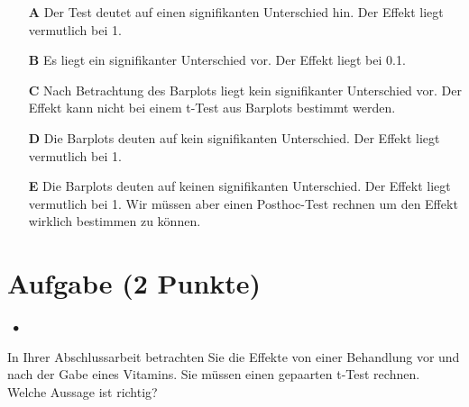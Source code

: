 \documentclass[a4paper, 9pt]{scrartcl}\usepackage[]{graphicx}\usepackage[]{xcolor}
\begin{document}
\begin{enumerate}
\item [\textbf{A} \msquare] Der Test deutet auf einen signifikanten Unterschied hin. Der Effekt liegt vermutlich bei 1.
\item [\textbf{B} \msquare] Es liegt ein signifikanter Unterschied vor. Der Effekt liegt bei 0.1.
\item [\textbf{C} \msquare] Nach Betrachtung des Barplots liegt kein signifikanter Unterschied vor. Der Effekt kann nicht bei einem t-Test aus Barplots bestimmt werden.
\item [\textbf{D} \msquare] Die Barplots deuten auf kein signifikanten Unterschied. Der Effekt liegt vermutlich bei 1.
\item [\textbf{E} \msquare] Die Barplots deuten auf keinen signifikanten Unterschied. Der Effekt liegt vermutlich bei 1. Wir müssen aber einen Posthoc-Test rechnen um den Effekt wirklich bestimmen zu können.
\end{enumerate}

\section{Aufgabe \hfill (2 Punkte)}

\ifcollection
\begin{flushright}
\tiny\vspace{-2Ex}
\textbf{\examinhaltstart}
\exammodulestatversuch $\;\bullet$
\exammodulebiostat
\vspace{-1Ex}
\end{flushright}
\fi





In Ihrer Abschlussarbeit betrachten Sie die Effekte von einer Behandlung vor und nach der Gabe eines Vitamins. Sie müssen einen gepaarten t-Test rechnen. Welche Aussage ist richtig?
\end{document}
